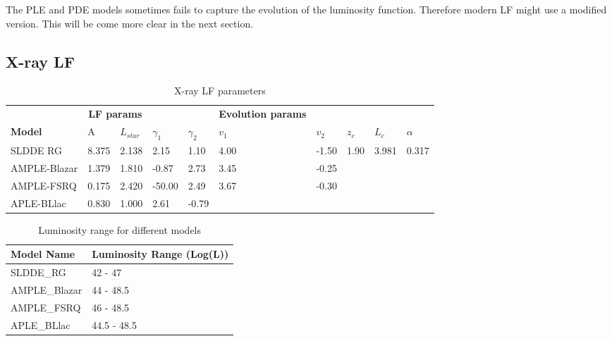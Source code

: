 \documentclass{article}
\begin{document}
The PLE and PDE models sometimes fails to capture the evolution of the luminosity function. Therefore modern 
LF might use a modified version. This will be come more clear in the next section.

\subsection{X-ray LF}

\begin{table}
\centering
\begin{tabularx}{\textwidth}{|l|XXXX|XXXXX|}
\hline

& \multicolumn{2}{c}{\textbf{LF params}} &&&  \textbf{Evolution params} &&&&\\

\textbf{Model} & A & $L_{star}$ & $\gamma _1$ &  $\gamma _2$  & $v_1$ & $v_2$ & $z_c$ & $L_c$ & $ \alpha$\\
\hline
SLDDE RG & 8.375 & 2.138 & 2.15 & 1.10 & 4.00 & -1.50 & 1.90 & 3.981 & 0.317  \\

AMPLE-Blazar & 1.379 & 1.810 & -0.87 & 2.73 & 3.45 & -0.25 & & &  \\

AMPLE-FSRQ & 0.175 & 2.420& -50.00 & 2.49 & 3.67 & -0.30 & & &  \\

APLE-BLlac & 0.830& 1.000 & 2.61 & -0.79 & & & & &  \\
\hline
\end{tabularx}
\caption{X-ray LF parameters}
\end{table}

\begin{table}
    \centering
    \begin{tabular}{ll}
    \hline
     Model Name   & Luminosity Range (Log(L))  \\
    \hline
     SLDDE\_RG     & 42 - 47            \\
     AMPLE\_Blazar & 44 - 48.5          \\
     AMPLE\_FSRQ   & 46 - 48.5          \\
     APLE\_BLlac   & 44.5 - 48.5        \\
    \hline

\end{tabular}
\caption{Luminosity range for different models}
\label{tab:lum_range}

\end{table}


\end{document}
